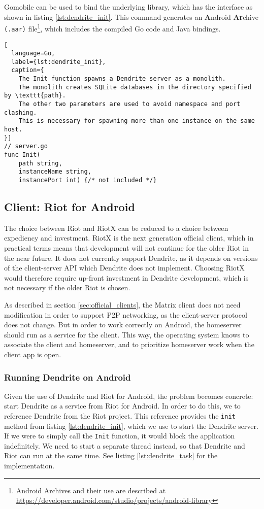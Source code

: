 Gomobile can be used to bind the underlying library, which has the interface as shown in listing \ref{lst:dendrite_init}.
This command generates an \textbf{A}ndroid \textbf{Ar}chive \texttt{(.aar)} file\footnote{Android Archives and their use are described at \url{https://developer.android.com/studio/projects/android-library}}, which includes the compiled Go code and Java bindings.

\begin{lstfloat}
    \begin{lstlisting}[
  language=Go,
  label={lst:dendrite_init},
  caption={
    The Init function spawns a Dendrite server as a monolith.
    The monolith creates SQLite databases in the directory specified by \texttt{path}.
    The other two parameters are used to avoid namespace and port clashing.
    This is necessary for spawning more than one instance on the same host.
}]
// server.go
func Init(
    path string,
    instanceName string,
    instancePort int) {/* not included */}
\end{lstlisting}
\end{lstfloat}

\subsection{Client: Riot for Android}
The choice between Riot and RiotX can be reduced to a choice between expediency and investment.
RiotX is the next generation official client, which in practical terms means that development will not continue for the older Riot in the near future.
It does not currently support Dendrite, as it depends on versions of the client-server API which Dendrite does not implement.
Choosing RiotX would therefore require up-front investment in Dendrite development, which is not necessary if the older Riot is chosen.

As described in section \ref{sec:official_clients}, the Matrix client does not need modification in order to support P2P networking, as the client-server protocol does not change.
But in order to work correctly on Android, the homeserver should run as a service for the client.
This way, the operating system knows to associate the client and homeserver, and to prioritize homeserver work when the client app is open.

\subsubsection{Running Dendrite on Android}
Given the use of Dendrite and Riot for Android, the problem becomes concrete: start Dendrite as a service from Riot for Android.
In order to do this, we to reference Dendrite from the Riot project.
This reference provides the \texttt{init} method from listing \ref{lst:dendrite_init}, which we use to start the Dendrite server.
If we were to simply call the \texttt{Init} function, it would block the application indefinitely.
We need to start a separate thread instead, so that Dendrite and Riot can run at the same time.
See listing \ref{lst:dendrite_task} for the implementation.

